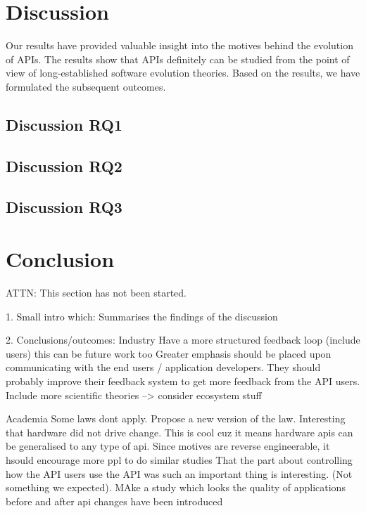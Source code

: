 \documentclass{sig-alternate}
\begin{document}
\section{Discussion} \label{discussion}
Our results have provided valuable insight into the motives behind the evolution of APIs. The results show that APIs definitely can be studied from the point of view of long-established software evolution theories. Based on the results, we have formulated the subsequent outcomes. 

\subsection{Discussion RQ1}  


\subsection{Discussion RQ2}



\subsection{Discussion RQ3}







\section{Conclusion} \label{conclusion}
ATTN: This section has not been started. 

1. Small intro which: Summarises the findings of the discussion

2. Conclusions/outcomes:
Industry
Have a more structured feedback loop (include users) this can be future work too
              Greater emphasis should be placed upon communicating with the end users / application developers. They should probably improve their feedback system to get more feedback from the API users.
              Include more scientific theories
              --> consider ecosystem stuff

Academia
Some laws dont apply. Propose a new version of the law.
Interesting that hardware did not drive change. This is cool cuz it means hardware apis can be generalised to any type of api.
Since motives are reverse engineerable, it hsould encourage more ppl to do similar studies
That the part about controlling how the API users use the API was such an important thing is interesting. (Not something we expected). 
       MAke a study which looks the quality of applications before and after api changes have been introduced
\end{document}
